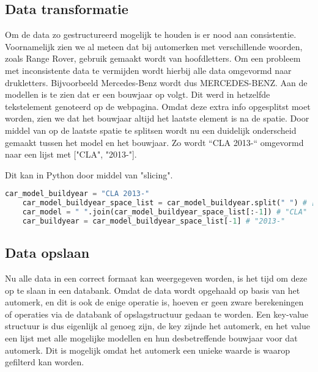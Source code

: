 \subsection{Data transformatie}
Om de data zo gestructureerd mogelijk te houden is er nood aan consistentie. Voornamelijk zien we al meteen dat bij automerken met verschillende woorden, zoals Range Rover, gebruik gemaakt wordt van hoofdletters. Om een probleem met inconsistente data te vermijden wordt hierbij alle data omgevormd naar drukletters. Bijvoorbeeld Mercedes-Benz wordt dus MERCEDES-BENZ. Aan de modellen is te zien dat er een bouwjaar op volgt. Dit werd in hetzelfde tekstelement genoteerd op de webpagina. Omdat deze extra info opgesplitst moet worden, zien we dat het bouwjaar altijd het laatste element is na de spatie. Door middel van op de laatste spatie te splitsen wordt nu een duidelijk onderscheid gemaakt tussen het model en het bouwjaar. Zo wordt “CLA 2013-“ omgevormd naar een lijst met ["CLA", "2013-"].

Dit kan in Python door middel van "slicing".

\begin{lstlisting}[language=Python, caption=Python splitst laatste element en alles ervoor op op spatie, breaklines=true, showstringspaces=false]
	car_model_buildyear = "CLA 2013-"
	car_model_buildyear_space_list = car_model_buildyear.split(" ") # ["CLA", "2013-"]
	car_model = " ".join(car_model_buildyear_space_list[:-1]) # "CLA"
	car_buildyear = car_model_buildyear_space_list[-1] # "2013-"
\end{lstlisting}

\subsection{Data opslaan}
Nu alle data in een correct formaat kan weergegeven worden, is het tijd om deze op te slaan in een databank. Omdat de data wordt opgehaald op basis van het automerk, en dit is ook de enige operatie is, hoeven er geen zware berekeningen of operaties via de databank of opslagstructuur gedaan te worden. Een key-value structuur is dus eigenlijk al genoeg zijn, de key zijnde het automerk, en het value een lijst met alle mogelijke modellen en hun desbetreffende bouwjaar voor dat automerk. Dit is mogelijk omdat het automerk een unieke waarde is waarop gefilterd kan worden.

